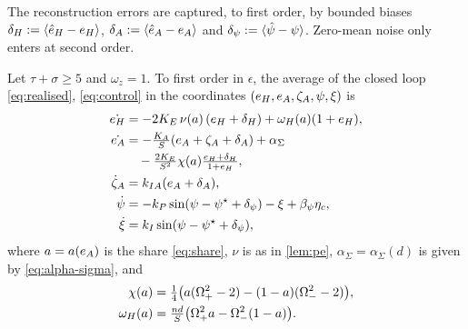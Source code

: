 \begin{assumption}\label{ass:meas}
The reconstruction errors are captured, to first order, by bounded biases
$\delta_H:=\langle \hat e_H-e_H\rangle$, $\delta_A:=\langle \hat e_A-e_A\rangle$ and
$\delta_\psi:=\langle \hat\psi-\psi\rangle$.
Zero-mean noise only enters at second order.
\end{assumption}

\begin{lemma}\label{lem:averaged}
Let $\tau+\sigma\ge5$ and $\omega_z=1$.
To first order in $\epsilon$, the average of the closed loop
\eqref{eq:realised}, \eqref{eq:control} in the coordinates
$(e_H,e_A,\zeta_A,\psi,\xi)$ is
\begin{subequations}\label{eq:avg}
\begin{align}
  \dot{e_H}&=-2K_E\,\nu(a)\,(e_H+\delta_H)+\omega_H(a)(1+e_H),\label{eq:avg-H}\\
  \dot{e_A}&=-\tfrac{K_A}{S}(e_A+\zeta_A+\delta_A)+\alpha_\Sigma\nonumber\\
    &\quad-\tfrac{2K_E}{S^2}\chi(a)\tfrac{e_H+\delta_H}{1+e_H},\label{eq:avg-A}\\
  \dot\zeta_A&=k_{IA}(e_A+\delta_A),\label{eq:avg-zeta}\\
  \dot\psi&=-k_P\sin(\psi-\psi^\star+\delta_\psi)-\xi+\beta_\psi\eta_c,\label{eq:avg-psi}\\
  \dot\xi&=k_I\sin(\psi-\psi^\star+\delta_\psi),\label{eq:avg-xi}
\end{align}
\end{subequations}
where $a=a(e_A)$ is the share \eqref{eq:share}, $\nu$ is as in \cref{lem:pe},
$\alpha_\Sigma=\alpha_\Sigma(d)$ is given by \eqref{eq:alpha-sigma}, and
\begin{align}
  \chi(a)&=\tfrac14\big(a(\Omega_+^2-2)-(1-a)(\Omega_-^2-2)\big),\label{eq:chi-omega}\\
  \omega_H(a)&=\tfrac{nd}{S}\big(\Omega_+^2a-\Omega_-^2(1-a)\big).\nonumber
\end{align}
\end{lemma}


